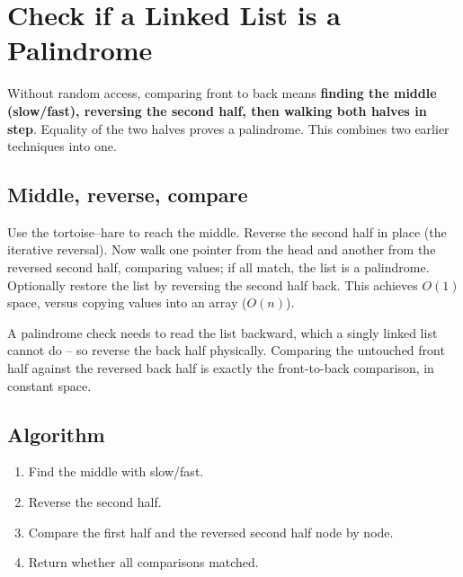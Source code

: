 \section{Check if a Linked List is a Palindrome}
\label{sec:ll-palindrome}


\begin{patternbox}
Without random access, comparing front to back means \textbf{finding the
middle (slow/fast), reversing the second half, then walking both halves in
step}. Equality of the two halves proves a palindrome. This combines two
earlier techniques into one.
\end{patternbox}

\subsection*{Middle, reverse, compare}

Use the tortoise--hare to reach the middle. Reverse the second half in place
(the iterative reversal). Now walk one pointer from the head and another
from the reversed second half, comparing values; if all match, the list is a
palindrome. Optionally restore the list by reversing the second half back.
This achieves $O(1)$ space, versus copying values into an array ($O(n)$).

\begin{ideabox}
A palindrome check needs to read the list backward, which a singly linked
list cannot do -- so reverse the back half physically. Comparing the
untouched front half against the reversed back half is exactly the
front-to-back comparison, in constant space.
\end{ideabox}

\subsection*{Algorithm}

\begin{enumerate}
  \item Find the middle with slow/fast.
  \item Reverse the second half.
  \item Compare the first half and the reversed second half node by node.
  \item Return whether all comparisons matched.
\end{enumerate}

